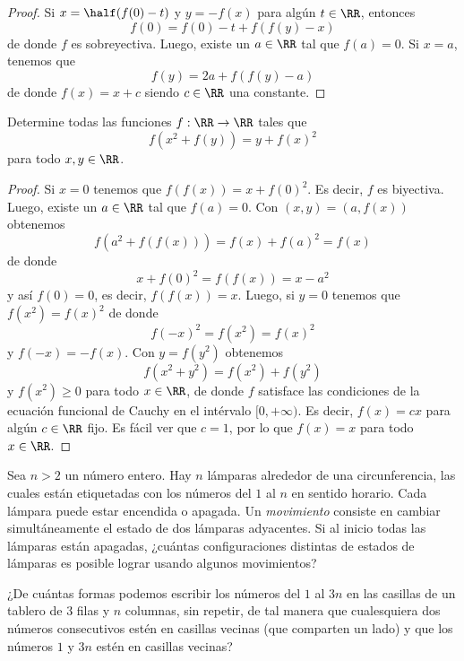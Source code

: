 \begin{proof}
	Si $x=\half(f(0)-t)$ y $y=-f(x)$ para algún $t\in\RR$, entonces
	\[f(0)=f(0)-t+f(f(y)-x)\]
	de donde $f$ es sobreyectiva. Luego, existe un $a\in\RR$ tal que $f(a)=0$. Si $x=a$, tenemos que
	\[f(y)=2a+f(f(y)-a)\]
	de donde $f(x)=x+c$ siendo $c\in\RR$ una constante.
\end{proof}

\begin{probEG}
	Determine todas las funciones $f:\RR\to\RR$ tales que
	\[f(x^2+f(y))=y+f(x)^2\]
	para todo $x,y\in\RR$.
\end{probEG}

\begin{proof}
	Si $x=0$ tenemos que $f(f(x))=x+f(0)^2$. Es decir, $f$ es biyectiva. Luego, existe un $a\in\RR$ tal que $f(a)=0$. Con $(x,y)=(a,f(x))$ obtenemos
	\[f(a^2+f(f(x)))=f(x)+f(a)^2=f(x)\]
	de donde
	\[x+f(0)^2=f(f(x))=x-a^2\]
	y así $f(0)=0$, es decir, $f(f(x))=x$. Luego, si $y=0$ tenemos que $f(x^2)=f(x)^2$ de donde
	\[f(-x)^2=f(x^2)=f(x)^2\]
	y $f(-x)=-f(x)$. Con $y=f(y^2)$ obtenemos
	\[f(x^2+y^2)=f(x^2)+f(y^2)\]
	y $f(x^2)\ge 0$ para todo $x\in\RR$, de donde $f$ satisface las condiciones de la ecuación funcional de Cauchy en el intérvalo $[0,+\infty)$. Es decir, $f(x)=cx$ para algún $c\in\RR$ fijo. Es fácil ver que $c=1$, por lo que $f(x)=x$ para todo $x\in\RR$.
\end{proof}


\begin{probEG}
	Sea $n>2$ un número entero. Hay $n$ lámparas alrededor de una circunferencia, las cuales están etiquetadas con los números del $1$ al $n$ en sentido horario. Cada lámpara puede estar encendida o apagada. Un \emph{movimiento} consiste en cambiar simultáneamente el estado de dos lámparas adyacentes. Si al inicio todas las lámparas están apagadas, ¿cuántas configuraciones distintas de estados de lámparas es posible lograr usando algunos movimientos?
\end{probEG}

\begin{probEG}
	¿De cuántas formas podemos escribir los números del $1$ al $3n$ en las casillas de un tablero de $3$ filas y $n$ columnas, sin repetir, de tal manera que cualesquiera dos números consecutivos estén en casillas vecinas (que comparten un lado) y que los números $1$ y $3n$ estén en casillas vecinas?
\end{probEG}

